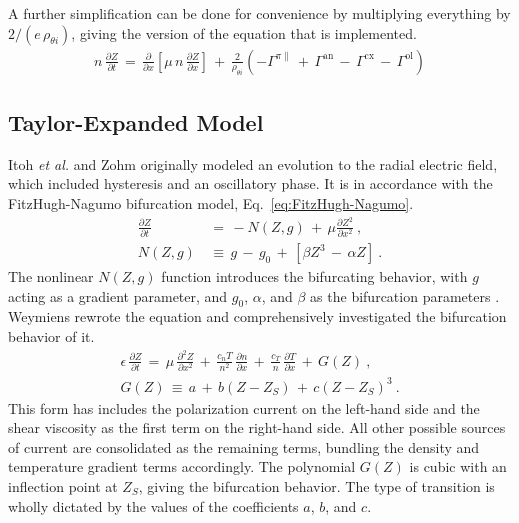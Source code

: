 A further simplification can be done for convenience by multiplying everything by $2 / (e \, \rho_{\theta i})$, giving the version of the equation that is implemented.
\begin{align} %
	n \, \frac{\partial Z}{\partial t} \,=\, \frac{\partial}{\partial x}
		\left[\mu \, n \, \frac{\partial Z}{\partial x}\right] \,+\,
		\frac{2}{\rho_{\theta i}} \left(-\Gamma^{\pi\parallel} \,+\,
		\Gamma^\text{an} \,-\, \Gamma^\text{cx} \,-\, \Gamma^\text{ol}\right)
		\label{eq:reduced_normalized_Z_equation}
\end{align}

\subsection{Taylor-Expanded Model}\label{ssec:original_Z_equation}
Itoh \emph{et al.} \cite{itoh_edge_1991} and Zohm \cite{zohm_dynamic_1994} originally modeled an evolution to the radial electric field, which included hysteresis and an oscillatory phase.
It is in accordance with the FitzHugh-Nagumo bifurcation model, Eq.~\ref{eq:FitzHugh-Nagumo}.
\begin{align} %
	\frac{\partial Z}{\partial t} \,&=\, -N(Z,g) \,+\, \mu
		\frac{\partial Z^2}{\partial x^2}~,\label{eq:original_z} \\
	N(Z,g) \,&\equiv\, g \,-\, g_0 \,+\, \left[\beta Z^3 \,-\, \alpha Z\right]~.
\end{align}
The nonlinear $N(Z,g)$ function introduces the bifurcating behavior, with $g$ acting as a gradient parameter, and $g_0$, $\alpha$, and $\beta$ as the bifurcation parameters \cite{itoh_model_1988}.
Weymiens \cite{weymiens_bifurcation_2012} rewrote the equation and comprehensively investigated the bifurcation behavior of it.
\begin{align} %
	\epsilon \, \frac{\partial Z}{\partial t} \,=\, \mu \,
		\frac{\partial^2 Z}{\partial x^2} \,+\, \frac{c_n T}{n^2} \,
		\frac{\partial n}{\partial x} \,+\, \frac{c_T}{n} \,
		\frac{\partial T}{\partial x} \,+\, G(Z)~,\label{eq:original_Z_equation} \\
	G(Z) \,\equiv\, a \,+\, b(Z - Z_S) \,+\, c(Z - Z_S)^3~.
		\label{eq:G_polynomial}
\end{align}
This form has includes the polarization current on the left-hand side and the shear viscosity as the first term on the right-hand side.
All other possible sources of current are consolidated as the remaining terms, bundling the density and temperature gradient terms accordingly.
The polynomial $G(Z)$ is cubic with an inflection point at $Z_S$, giving the bifurcation behavior.
The type of transition is wholly dictated by the values of the coefficients $a$, $b$, and $c$.

